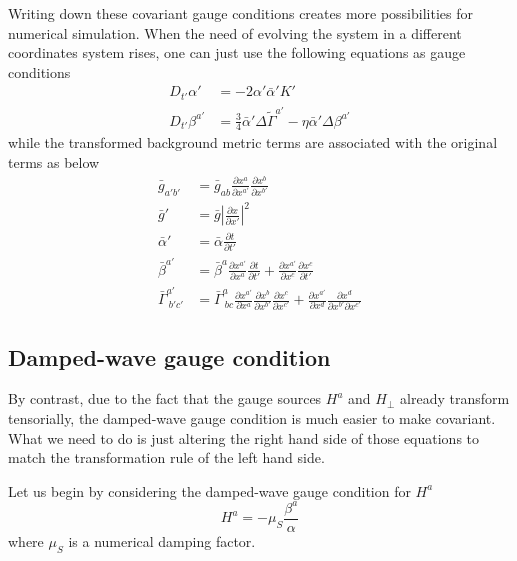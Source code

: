 Writing down these covariant gauge conditions creates more possibilities for numerical simulation. When the need of evolving the system in a different coordinates system rises, one can just use the following equations as gauge conditions
\begin{align*}
D_{t'}\alpha' & = -2\alpha'{\bar \alpha}'K'\\
D_{t'}\beta^{a'} & = \frac{3}{4}{\bar \alpha}'\Delta {\tilde \Gamma}^{a'} - \eta {\bar \alpha}'\Delta\beta^{a'}
\end{align*}
while the transformed background metric terms are associated with the original terms as below
\begin{align}
{\bar g}_{a'b'} & = {\bar g}_{ab}\frac{\partial x^{a}}{\partial x^{a'}}\frac{\partial x^{b}}{\partial x^{b'}}\\
{\bar g'} & = {\bar g}\left|\frac{\partial x}{\partial x'}\right|^{2}\\
{\bar \alpha}' & = {\bar \alpha}\frac{\partial t}{\partial t'}\\
{\bar \beta}^{a'} & = {\bar \beta}^{a}\frac{\partial x^{a'}}{\partial x^{a}}\frac{\partial t}{\partial t'} + \frac{\partial x^{a'}}{\partial x^{c}}\frac{\partial x^{c}}{\partial t'}\label{background shift}\\
{\bar \Gamma}^{a'}_{~b'c'} & = {\bar \Gamma}^{a}_{~bc}\frac{\partial x^{a'}}{\partial x^{a}}\frac{\partial x^{b}}{\partial x^{b'}}\frac{\partial x^{c}}{\partial x^{c'}} + \frac{\partial x^{a'}}{\partial x^{d}}\frac{\partial x^{d}}{\partial x^{b'}\partial x^{c'}}
\end{align}

\subsection{Damped-wave gauge condition}\label{dampedwave}
By contrast, due to the fact that the gauge sources $H^{a}$ and $H_{\perp}$ already transform tensorially, the damped-wave gauge condition is much easier to make covariant. What we need to do is just altering the right hand side of those equations to match the transformation rule of the left hand side. 

Let us begin by considering the damped-wave gauge condition for $H^{a}$
\begin{equation}\label{damped gauge vector}
H^{a} = -\mu_{S}\frac{\beta^{a}}{\alpha}
\end{equation}
where $\mu_{S}$ is a numerical damping factor. 

